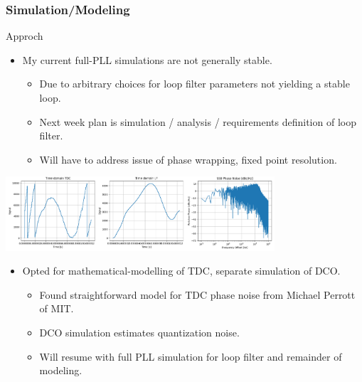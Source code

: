 \documentclass[t, screen, aspectratio=43]{beamer}
\begin{document}
\begin{frame}
	\frametitle{Simulation/Modeling}
	\begin{block}{Approch}
		\vspace{-.2em}
		\begin{itemize}
			\footnotesize
			\item My current full-PLL simulations are not generally stable.
			\begin{itemize}
				\scriptsize
				\item Due to arbitrary choices for loop filter parameters not yielding a stable loop.				
				\item Next week plan is simulation / analysis / requirements definition of loop filter.
				\item Will have to address issue of phase wrapping, fixed point resolution.
			\end{itemize}
		\end{itemize} 	
		\vspace{-1.5em}
		\center\includegraphics[width=0.75\textwidth, angle=0]{unstable2.png}
		\vspace{-0.5em}
		\begin{itemize}
			\footnotesize
			\item Opted for mathematical-modelling of TDC, separate simulation of DCO.
			\begin{itemize}
				\scriptsize
				\item Found straightforward model for TDC phase noise from Michael Perrott of MIT.
				\item DCO simulation estimates quantization noise.
				\item Will resume with full PLL simulation for loop filter and remainder of modeling.
			\end{itemize} 

		\end{itemize}    
	\end{block}
\end{frame}



\end{document}
